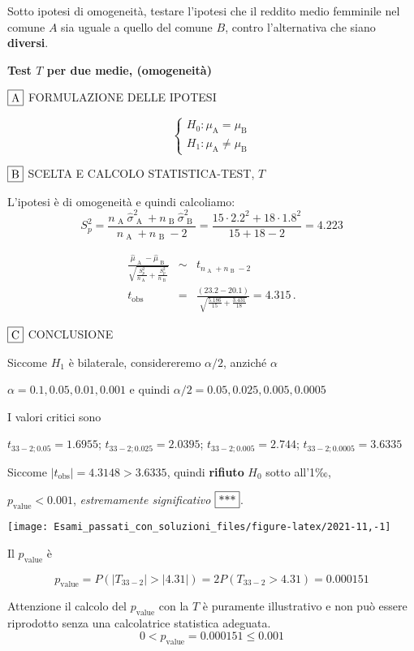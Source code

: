 \documentclass[
  11pt,
]{book}
\theoremstyle{mytheoremstyle}
\theoremstyle{mydefstyle}
\newenvironment{sol}
  {
  \begin{tcolorbox}[enhanced,breakable,arc=0.1mm,boxrule=1pt,colback=white,colframe=iblue,
  title=\bf \fontfamily{lmss}\selectfont \hspace{.5 cm} Soluzione,drop fuzzy shadow]

}{
\end{tcolorbox}
  }
\begin{document}
Sotto ipotesi di omogeneità, testare l'ipotesi che il reddito medio femminile nel comune \(A\) sia uguale a quello del comune \(B\), contro l'alternativa che siano \textbf{diversi}.

\begin{sol}
\textbf{Test \(T\) per due medie, (omogeneità)}

\(\fbox{A}\) FORMULAZIONE DELLE IPOTESI

\[\begin{cases}
   H_0: \mu_\text{A} = \mu_\text{B} \\
   H_1: \mu_\text{A} \neq \mu_\text{B} 
   \end{cases}\]

\(\fbox{B}\) SCELTA E CALCOLO STATISTICA-TEST, \(T\)

L'ipotesi è di omogeneità e quindi calcoliamo:\[
   S_p^2=\frac{n_\text{ A }\hat\sigma^2_\text{ A }+n_\text{ B }\hat\sigma^2_\text{ B }}{n_\text{ A }+n_\text{ B }-2} =
   \frac{ 15 \cdot 2.2 ^2+ 18 \cdot 1.8 ^2}{ 15 + 18 -2}= 4.223 
  \]

\begin{eqnarray*}
  \frac{\hat\mu_\text{ A } - \hat\mu_\text{ B }}
  {\sqrt{\frac {S^2_p}{n_\text{ A }}+\frac {S^2_p}{n_\text{ B }}}}&\sim&t_{n_\text{ A }+n_\text{ B }-2}\\
  t_{\text{obs}}
  &=& \frac{ ( 23.2 -  20.1 )} {\sqrt{\frac{ 5.186 }{ 15 }+\frac{ 3.431 }{ 18 }}}
  =   4.315 \, .
  \end{eqnarray*}

\(\fbox{C}\) CONCLUSIONE

Siccome \(H_1\) è bilaterale, considereremo \(\alpha/2\),
anziché \(\alpha\)

\(\alpha=0.1, 0.05, 0.01, 0.001\) e quindi \(\alpha/2=0.05, 0.025, 0.005, 0.0005\)

I valori critici sono

\(t_{33-2;0.05}=1.6955\); \(t_{33-2;0.025}=2.0395\); \(t_{33-2;0.005}=2.744\); \(t_{33-2;0.0005}=3.6335\)

Siccome \(|t_\text{obs}|=4.3148>3.6335\), quindi \textbf{rifiuto} \(H_0\) sotto all'1‰,

\(p_\text{value}<0.001\), \emph{estremamente significativo} \(\fbox{***}\).

\begin{center}\texttt{[image: Esami\_passati\_con\_soluzioni\_files/figure-latex/2021-11,-1]} \end{center}

Il \(p_{\text{value}}\) è

\[ p_{\text{value}} = P(|T_{33-2}|>|4.31|)=2P(T_{33-2}>4.31)=0.000151 \]

Attenzione il calcolo del \(p_\text{value}\) con la \(T\) è puramente illustrativo e non può essere riprodotto senza una calcolatrice statistica adeguata.\[
 0 < p_\text{value}= 0.000151 \leq 0.001 
\]

\end{sol}
\end{document}
